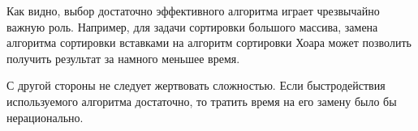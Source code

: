 Как видно, выбор достаточно эффективного алгоритма играет чрезвычайно
важную роль. Например, для задачи сортировки большого массива, замена
алгоритма сортировки вставками на алгоритм сортировки Хоара может
позволить получить результат за намного меньшее время.

С другой стороны не следует жертвовать сложностью. Если быстродействия
используемого алгоритма достаточно, то тратить время на его замену
было бы нерационально.
